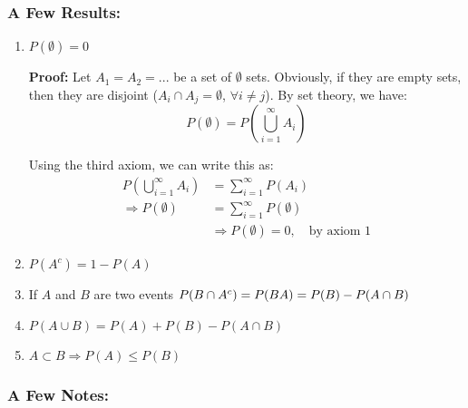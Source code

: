 \documentclass{article}
\begin{document}
\subsubsection{A Few Results:}
\begin{enumerate}
    \item $P(\emptyset) = 0$
    
    \textbf{Proof:} Let $A_1 = A_2 = ...$ be a set of $\emptyset$ sets. Obviously, if they are empty sets, then they are disjoint ($A_i \cap A_j = \emptyset$, $\forall i \neq j$). By set theory, we have:
    \begin{equation*}
        P(\emptyset) = P(\bigcup\limits_{i=1}^{\infty} A_{i})
    \end{equation*}
    
    Using the third axiom, we can write this as:
    \begin{equation*}
    \begin{split}
        P(\bigcup\limits_{i=1}^{\infty} A_{i}) &= \sum\limits_{i=1}^\infty P(A_i)\\
        \Rightarrow P(\emptyset) &= \sum\limits_{i=1}^\infty P(\emptyset)\\
        &\Rightarrow P(\emptyset) = 0, \quad \text{by axiom 1}
    \end{split}
    \end{equation*}
    
    \item $P(A^c) = 1-P(A)$
    
    \item If $A$ and $B$ are two events $P(B\cap A^c) = P(B\\A) = P(B)-P(A\cap B)$
    
    \item $P(A\cup B) = P(A) + P(B) - P(A\cap B)$
    
    \item $A \subset B \Rightarrow P(A) \leq P(B)$
\end{enumerate}

\subsubsection{A Few Notes:}
\end{document}
